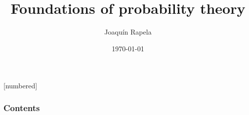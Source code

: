 
\usepackage{setspace}

\newtheorem{probDef}{Definition}
\newtheorem*{probDef*}{Definition}
\newtheorem{claim}{Claim}
\newtheorem*{claim*}{Claim}
\newtheorem{probExample}{Example}
\newtheorem{probRule}{Rule}
\newtheorem{probAxiom}{Axiom}
[numbered]

\newtheorem{manualprobRuleinner}{Rule}
\newenvironment{manualProbRule}[1]{%
  \renewcommand\themanualprobRuleinner{#1}%
  \manualprobRuleinner
}{\endmanualprobRuleinner}

\newtheorem{manualprobExampleinner}{Example}
\newenvironment{manualProbExample}[1]{%
  \renewcommand\themanualprobExampleinner{#1}%
  \manualprobExampleinner
}{\endmanualprobExampleinner}

\newcommand{\seti}{\setcounter{saveenumi}{\value{enumi}}}
\newcommand{\conti}{\setcounter{enumi}{\value{saveenumi}}}
\newcommand{\keepi}{\addtocounter{saveenumi}{-1}\setcounter{enumi}{\value{saveenumi}}}


\title{Foundations of probability theory}

\author{Joaqu\'{i}n Rapela} %
\date{\today} %




\begin{frame}
\titlepage %
\end{frame}

\begin{frame}
\frametitle{Contents} %
\tableofcontents %
\end{frame}

